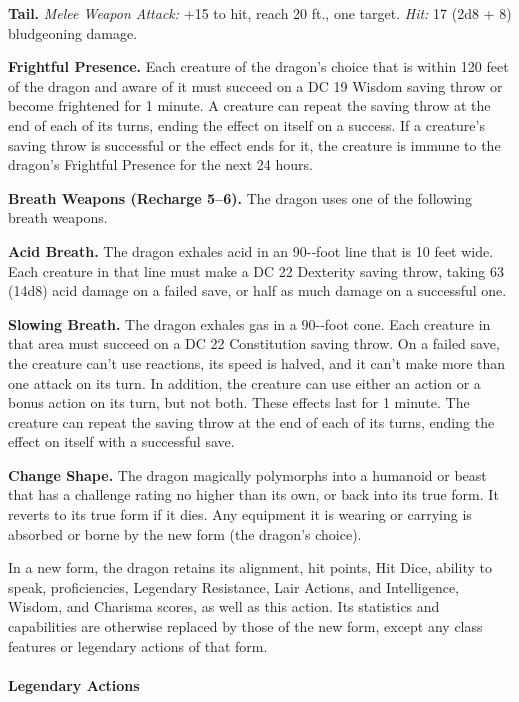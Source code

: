 \documentclass[
]{article}
\begin{document}
\textbf{Tail.} \emph{Melee Weapon Attack:} +15 to hit, reach 20 ft., one
target. \emph{Hit:} 17 (2d8 + 8) bludgeoning damage.

\textbf{Frightful Presence.} Each creature of the dragon's choice that
is within 120 feet of the dragon and aware of it must succeed on a DC 19
Wisdom saving throw or become frightened for 1 minute. A creature can
repeat the saving throw at the end of each of its turns, ending the
effect on itself on a success. If a creature's saving throw is
successful or the effect ends for it, the creature is immune to the
dragon's Frightful Presence for the next 24 hours.

\textbf{Breath Weapons (Recharge 5--6).} The dragon uses one of the
following breath weapons.

\textbf{Acid Breath.} The dragon exhales acid in an 90-­‐foot line that
is 10 feet wide. Each creature in that line must make a DC 22 Dexterity
saving throw, taking 63 (14d8) acid damage on a failed save, or half as
much damage on a successful one.

\textbf{Slowing Breath.} The dragon exhales gas in a 90-­‐foot cone.
Each creature in that area must succeed on a DC 22 Constitution saving
throw. On a failed save, the creature can't use reactions, its speed is
halved, and it can't make more than one attack on its turn. In addition,
the creature can use either an action or a bonus action on its turn, but
not both. These effects last for 1 minute. The creature can repeat the
saving throw at the end of each of its turns, ending the effect on
itself with a successful save.

\textbf{Change Shape.} The dragon magically polymorphs into a humanoid
or beast that has a challenge rating no higher than its own, or back
into its true form. It reverts to its true form if it dies. Any
equipment it is wearing or carrying is absorbed or borne by the new form
(the dragon's choice).

In a new form, the dragon retains its alignment, hit points, Hit Dice,
ability to speak, proficiencies, Legendary Resistance, Lair Actions, and
Intelligence, Wisdom, and Charisma scores, as well as this action. Its
statistics and capabilities are otherwise replaced by those of the new
form, except any class features or legendary actions of that form.

\hypertarget{legendary-actions-14}{%
\paragraph{Legendary Actions}\label{legendary-actions-14}}
\end{document}
